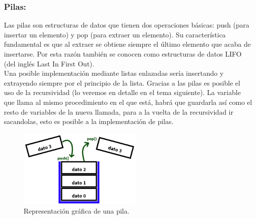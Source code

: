\documentclass[12pt,letterpaper]{article}
\begin{document}
\subsubsection{Pilas:}
Las pilas son estructuras de datos que tienen dos operaciones básicas: push (para insertar un elemento) y pop (para extraer un elemento). Su característica fundamental es que al extraer se obtiene siempre el último elemento que acaba de insertarse. Por esta razón también se conocen como estructuras de datos LIFO (del inglés Last In First Out).\\
Una posible implementación mediante listas enlazadas serí­a insertando y extrayendo siempre por el principio de la lista. Gracias a las pilas es posible el uso de la recursividad (lo veremos en detalle en el tema siguiente). La variable que llama al mismo procedimiento en el que está, habrá que guardarla así­ como el resto de variables de la nueva llamada, para a la vuelta de la recursividad ir sacandolas, esto es posible a la implementación de pilas. 
\begin{figure}[ht]
\begin{center}
\includegraphics[width=6cm]{./Imagenes/pila.png}
\caption{Representación gráfica de una pila.}
\label{rg3}
\end{center}
\end{figure}
\end{document}
